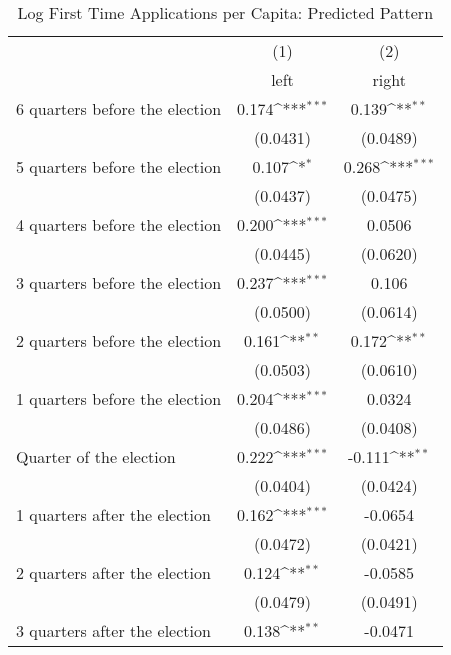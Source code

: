 \begin{table}[htbp]\centering
\def\sym#1{\ifmmode^{#1}\else\(^{#1}\)\fi}
\caption{Log First Time Applications per Capita: Predicted Pattern}
\begin{tabular}{l*{2}{c}}
\hline\hline
                    &\multicolumn{1}{c}{(1)}&\multicolumn{1}{c}{(2)}\\
                    &\multicolumn{1}{c}{left}&\multicolumn{1}{c}{right}\\
\hline
 6 quarters before the election&       0.174\sym{***}&       0.139\sym{**} \\
                    &    (0.0431)         &    (0.0489)         \\
[1em]
 5 quarters before the election&       0.107\sym{*}  &       0.268\sym{***}\\
                    &    (0.0437)         &    (0.0475)         \\
[1em]
 4 quarters before the election&       0.200\sym{***}&      0.0506         \\
                    &    (0.0445)         &    (0.0620)         \\
[1em]
 3 quarters before the election&       0.237\sym{***}&       0.106         \\
                    &    (0.0500)         &    (0.0614)         \\
[1em]
 2 quarters before the election&       0.161\sym{**} &       0.172\sym{**} \\
                    &    (0.0503)         &    (0.0610)         \\
[1em]
 1 quarters before the election&       0.204\sym{***}&      0.0324         \\
                    &    (0.0486)         &    (0.0408)         \\
[1em]
Quarter of the election&       0.222\sym{***}&      -0.111\sym{**} \\
                    &    (0.0404)         &    (0.0424)         \\
[1em]
 1 quarters after the election&       0.162\sym{***}&     -0.0654         \\
                    &    (0.0472)         &    (0.0421)         \\
[1em]
 2 quarters after the election&       0.124\sym{**} &     -0.0585         \\
                    &    (0.0479)         &    (0.0491)         \\
[1em]
 3 quarters after the election&       0.138\sym{**} &     -0.0471         \\

\end{tabular}
\end{table}
